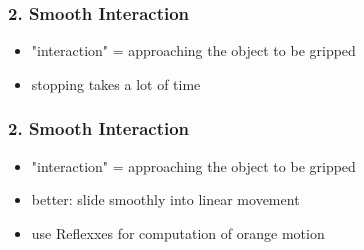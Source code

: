 \documentclass[12pt, %
			  t     %
]{beamer}%
\begin{document}
\begin{frame}
\frametitle{2. Smooth Interaction}
  \begin{itemize}
    \item "interaction" = approaching the object to be gripped
  \end{itemize}

  \centering
    \begin{itemize}
      \item stopping takes a lot of time\\
    \end{itemize} 
\end{frame}


\begin{frame}
\frametitle{2. Smooth Interaction}
  \begin{itemize}
    \item "interaction" = approaching the object to be gripped
  \end{itemize}
  
  \centering
  \begin{itemize}
    \item better: slide smoothly into linear movement
    \item use Reflexxes for computation of orange motion
  \end{itemize}
\end{frame}
\end{document}
